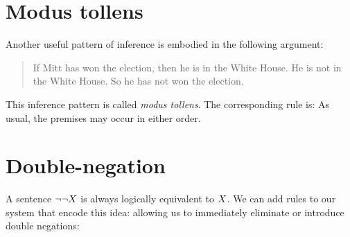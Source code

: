 \section{Modus tollens}
Another useful pattern of inference is embodied in the following argument:
	\begin{quote}
		If Mitt has won the election, then he is in the White House. He is not in the White House. So he has not won the election.
	\end{quote}
This inference pattern is called \emph{modus tollens}. The corresponding rule is:
As usual, the premises may occur in either order.


\section{Double-negation}
A sentence $\neg\neg X$ is always logically equivalent to $X$.
We can add rules to our system that encode this idea: allowing us to immediately eliminate or introduce double negations:
\begin{highlighted}
\begin{fitchproof}
\end{fitchproof}
\end{highlighted}
\begin{highlighted}
\begin{fitchproof}
\end{fitchproof}
\end{highlighted}
%
%

